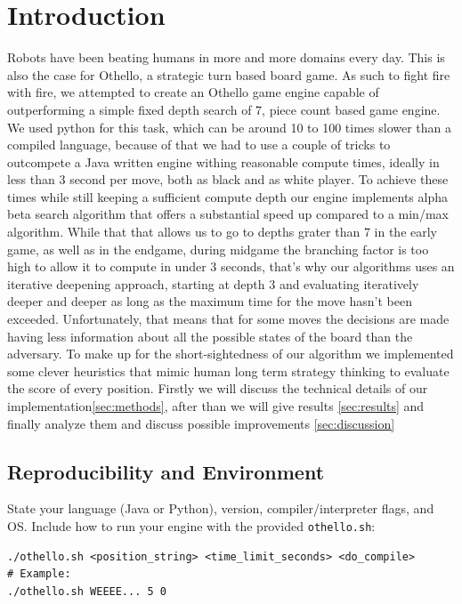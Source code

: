 \documentclass[10pt, titlepage, oneside, a4paper]{article}
\begin{document}
\section{Introduction}
\label{sec:intro}
Robots have been beating humans in more and more domains every day. This is also the case for Othello, a strategic turn based board game. As such to fight fire with fire, we attempted to create an Othello game engine capable of outperforming a simple fixed depth search of 7, piece count based game engine. 
We used python for this task, which can be around 10 to 100 times slower than a compiled language, because of that we had to use a couple of tricks to outcompete a Java written engine withing reasonable compute times, ideally in less than 3 second per move, both as black and as white player. To achieve these times while still keeping a sufficient compute depth our engine implements alpha beta search algorithm that offers a substantial speed up compared to a min/max algorithm. While that that allows us to go to depths grater than 7 in the early game, as well as in the endgame, during midgame the branching factor is too high to allow it to compute in under 3 seconds, that's why our algorithms uses an iterative deepening approach, starting at depth 3 and evaluating iteratively deeper and deeper as long as the maximum time for the move hasn't been exceeded. Unfortunately, that means that for some moves the decisions are made having less information about all the possible states of the board than the adversary. To make up for the short-sightedness of our algorithm we implemented some clever heuristics that mimic human long term strategy thinking to evaluate the score of every position. 
Firstly we will discuss the technical details of our implementation\ref{sec:methods}, after than we will give results \ref{sec:results} and finally analyze them and discuss possible improvements \ref{sec:discussion}



\subsection{Reproducibility and Environment}
State your language (Java or Python), version, compiler/interpreter flags, and OS.
Include how to run your engine with the provided \texttt{othello.sh}:
\begin{verbatim}
./othello.sh <position_string> <time_limit_seconds> <do_compile>
# Example:
./othello.sh WEEEE... 5 0
\end{verbatim}
\end{document}
